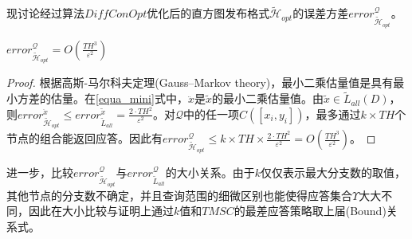 现讨论经过算法$DiffConOpt$优化后的直方图发布格式$\tilde{\mathcal{H}}_{opt}$的误差方差$error_{\tilde{\mathcal{H}}_{opt}}^{\mathcal{Q}}$。

\begin{prop}
	\label{chap4_prop5}
	$error_{\tilde{\mathcal{H}}_{opt}}^{\mathcal{Q}} = O(\frac{TH^3}{\varepsilon^2})$
\end{prop}
\begin{proof}
	根据高斯-马尔科夫定理(Gauss–Markov theory)\cite{gauss_markov}，最小二乘估量值是具有最小方差的估量。在\ref{equa_mini}式中，$\ddot{x}$是$\tilde{x}$的最小二乘估量值。由$\tilde{x} \in \tilde{L}_{all}(D)$，则$error_{\tilde{\mathcal{H}}_{opt}}^{\ddot{x}} \leqslant error_{\tilde{L}_{all}}^{\tilde{x}} = \frac{2 \cdotp TH^2}{\varepsilon^2}$。对$\mathcal{Q}$中的任一项$C([x_{i},y_{i}])$，最多通过$k\times TH$个节点的组合能返回应答。因此有$error_{\tilde{\mathcal{H}}_{opt}}^{\mathcal{Q}} \leqslant k \times TH \times \frac{2 \cdotp TH^2}{\varepsilon^2} = O(\frac{TH^3}{\varepsilon^2})$。
\end{proof}

进一步，比较$error_{\tilde{\mathcal{H}}_{opt}}^{\mathcal{Q}}$与$error_{\tilde{L}_{all}}^{\mathcal{Q}}$的大小关系。由于$k$仅仅表示最大分支数的取值，其他节点的分支数不确定，并且查询范围的细微区别也能使得应答集合$\Upsilon$大大不同，因此在大小比较与证明上通过$k$值和$TMSC$的最差应答策略取上届(Bound)关系式。

